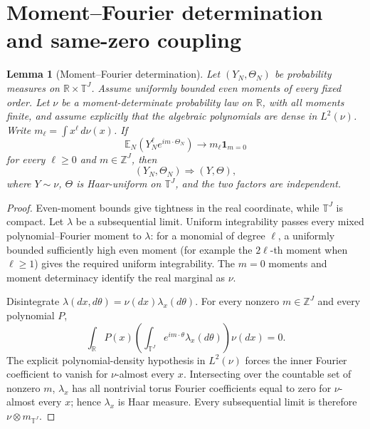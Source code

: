 \documentclass[pdflatex,sn-mathphys-num]{sn-jnl}
\numberwithin{equation}{section}
\theoremstyle{thmstyleone}
\newtheorem{lemma}[theorem]{Lemma}
\theoremstyle{thmstylethree}
\theoremstyle{thmstyletwo}
\newcommand{\R}{\mathbb R}
\newcommand{\Z}{\mathbb Z}
\newcommand{\Torus}{\mathbb T}
\newcommand{\E}{\mathbb E}
\newcommand{\1}{\mathbf 1}
\begin{document}
\section{Moment--Fourier determination and same-zero coupling}

\begin{lemma}[Moment--Fourier determination]
\label{lem:MF}
Let \((Y_N,\Theta_N)\) be probability measures on \(\R\times\Torus^J\).
Assume uniformly bounded even moments of every fixed order.  Let \(\nu\) be a
moment-determinate probability law on \(\R\), with all moments finite, and
assume explicitly that the algebraic polynomials are dense in \(L^2(\nu)\).
Write \(m_\ell=\int x^\ell\,d\nu(x)\).  If
\begin{equation}
 \E_N\!\left(Y_N^\ell e^{im\cdot\Theta_N}\right)
 \longrightarrow m_\ell\1_{m=0}
\label{eq:MF_generic}
\end{equation}
for every \(\ell\ge0\) and \(m\in\Z^J\), then
\begin{equation}
 (Y_N,\Theta_N)\Longrightarrow(Y,\Theta),
\label{eq:MF_generic_conclusion}
\end{equation}
where \(Y\sim\nu\), \(\Theta\) is Haar-uniform on \(\Torus^J\), and the two
factors are independent.
\end{lemma}

\begin{proof}
Even-moment bounds give tightness in the real coordinate, while \(\Torus^J\)
is compact.  Let \(\lambda\) be a subsequential limit.  Uniform integrability
passes every mixed polynomial--Fourier moment to \(\lambda\): for a monomial
of degree \(\ell\), a uniformly bounded sufficiently high even moment (for
example the \(2\ell\)-th moment when \(\ell\ge1\)) gives the required
uniform integrability.  The \(m=0\)
moments and moment determinacy identify the real marginal as \(\nu\).

Disintegrate
\(\lambda(dx,d\theta)=\nu(dx)\lambda_x(d\theta)\).  For every nonzero
\(m\in\Z^J\) and every polynomial \(P\),
\begin{equation}
 \int_{\R}P(x)
 \left(\int_{\Torus^J}e^{im\cdot\theta}\lambda_x(d\theta)\right)\nu(dx)=0.
\label{eq:conditional_fourier_zero}
\end{equation}
The explicit polynomial-density hypothesis in \(L^2(\nu)\) forces the inner
Fourier coefficient to vanish for \(\nu\)-almost every \(x\).  Intersecting
over the countable set of nonzero \(m\), \(\lambda_x\) has all nontrivial
torus Fourier coefficients equal to zero for \(\nu\)-almost every \(x\);
hence \(\lambda_x\) is Haar measure.  Every subsequential limit is therefore
\(\nu\otimes m_{\Torus^J}\).
\end{proof}
\end{document}
